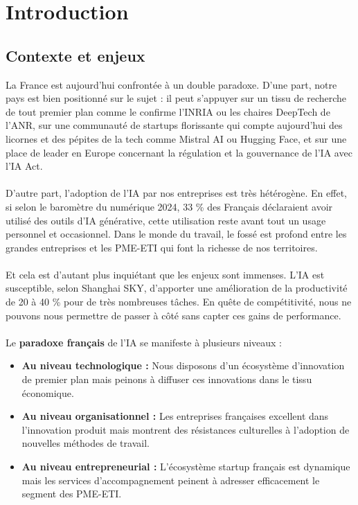 \chapter{Introduction}
\label{chap:introduction}

\section{Contexte et enjeux}

La France est aujourd’hui confrontée à un double paradoxe. D’une part, notre pays est bien positionné sur le sujet : il peut s’appuyer sur un tissu de recherche de tout premier plan comme le confirme l’INRIA ou les chaires DeepTech de l’ANR, sur une communauté de startups florissante qui compte aujourd’hui des licornes et des pépites de la tech comme Mistral AI ou Hugging Face, et sur une place de leader en Europe concernant la régulation et la gouvernance de l’IA avec l’IA Act.
\\\\
D’autre part, l’adoption de l’IA par nos entreprises est très hétérogène. En effet, si selon le baromètre du numérique 2024, 33 \% des Français déclaraient avoir utilisé des outils d’IA générative, cette utilisation reste avant tout un usage personnel et occasionnel. Dans le monde du travail, le fossé est profond entre les grandes entreprises et les PME-ETI qui font la richesse de nos territoires.
\\\\
Et cela est d’autant plus inquiétant que les enjeux sont immenses. L’IA est susceptible, selon Shanghai SKY, d’apporter une amélioration de la productivité de 20 à 40 \% pour de très nombreuses tâches. En quête de compétitivité, nous ne pouvons nous permettre de passer à côté sans capter ces gains de performance.
\\\\
Le \textbf{paradoxe français} de l'IA se manifeste à plusieurs niveaux :
\\
\begin{itemize}
    \item \textbf{Au niveau technologique :} Nous disposons d'un écosystème d'innovation de premier plan mais peinons à diffuser ces innovations dans le tissu économique.
    \item \textbf{Au niveau organisationnel :} Les entreprises françaises excellent dans l'innovation produit mais montrent des résistances culturelles à l'adoption de nouvelles méthodes de travail.
    \item \textbf{Au niveau entrepreneurial :} L'écosystème startup français est dynamique mais les services d'accompagnement peinent à adresser efficacement le segment des PME-ETI.
\end{itemize}

